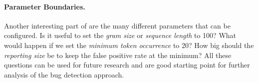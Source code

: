 \paragraph{Parameter Boundaries.}
Another interesting part of  are the many different parameters that can be configured. Is it useful to set the \textit{gram size} or \textit{sequence length} to 100? What would happen if we set the \textit{minimum token occurrence} to 20? How big should the \textit{reporting size} be to keep the false positive rate at the minimum? All these questions can be used for future research and are good starting point for further analysis of the \ngram{} bug detection approach.






 
